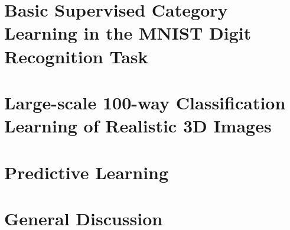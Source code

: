 \documentclass[11pt,twoside]{article}
\newif\myifpdf
\begin{document}
\section{Basic Supervised Category Learning in the MNIST Digit Recognition Task}

\section{Large-scale 100-way Classification Learning of Realistic 3D Images}

\section{Predictive Learning}

\section{General Discussion}


\end{document}
